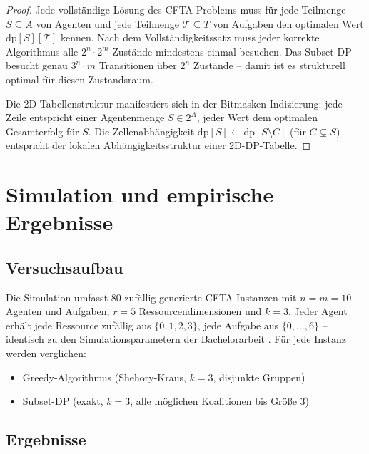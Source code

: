 \documentclass[a4paper,12pt]{article}
\theoremstyle{definition}
\begin{document}
\begin{proof}
    Jede vollst\"{a}ndige L\"{o}sung des CFTA-Problems muss f\"{u}r jede
    Teilmenge $S \subseteq A$ von Agenten und jede Teilmenge $\mathcal{T} \subseteq T$
    von Aufgaben den optimalen Wert $\mathrm{dp}[S][\mathcal{T}]$ kennen.
    Nach dem Vollst\"{a}ndigkeitssatz \cite{epp2026struktur} muss jeder korrekte
    Algorithmus alle $2^n \cdot 2^m$ Zust\"{a}nde mindestens einmal besuchen.
    Das Subset-DP besucht genau $3^n \cdot m$ Transitionen \"{u}ber $2^n$ Zust\"{a}nde
    -- damit ist es strukturell optimal f\"{u}r diesen Zustandsraum.

    Die 2D-Tabellenstruktur manifestiert sich in der Bitmasken-Indizierung:
    jede Zeile entspricht einer Agentenmenge $S \in 2^A$, jeder Wert dem
    optimalen Gesamterfolg f\"{u}r $S$. Die Zellenabh\"{a}ngigkeit
    $\mathrm{dp}[S] \leftarrow \mathrm{dp}[S \setminus C]$ (f\"{u}r $C \subsetneq S$)
    entspricht der lokalen Abh\"{a}ngigkeitsstruktur einer 2D-DP-Tabelle. \qedhere
\end{proof}

\section{Simulation und empirische Ergebnisse}

\subsection{Versuchsaufbau}

Die Simulation umfasst 80 zuf\"{a}llig generierte CFTA-Instanzen mit
$n = m = 10$ Agenten und Aufgaben, $r = 5$ Ressourcendimensionen und $k = 3$.
Jeder Agent erh\"{a}lt jede Ressource zuf\"{a}llig aus $\{0, 1, 2, 3\}$,
jede Aufgabe aus $\{0, \ldots, 6\}$ -- identisch zu den Simulationsparametern
der Bachelorarbeit \cite{epp2026}. F\"{u}r jede Instanz werden verglichen:
\begin{itemize}
    \item Greedy-Algorithmus (Shehory-Kraus, $k = 3$, disjunkte Gruppen)
    \item Subset-DP (exakt, $k = 3$, alle m\"{o}glichen Koalitionen bis Gr\"{o}{\ss}e 3)
\end{itemize}

\subsection{Ergebnisse}
\end{document}
